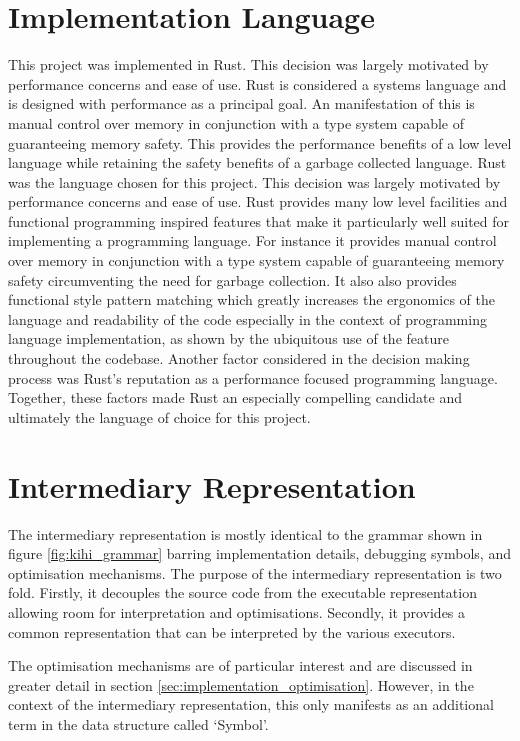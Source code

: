 \section{Implementation Language}
This project was implemented in Rust. This decision was largely motivated by performance concerns and ease of use. Rust is considered a systems language and is designed with performance as a principal goal. An manifestation of this is manual control over memory in conjunction with a type system capable of guaranteeing memory safety. This provides the performance benefits of a low level language while retaining the safety benefits of a garbage collected language. 
Rust was the language chosen for this project. This decision was largely motivated by performance concerns and ease of use. Rust provides many low level facilities and functional programming inspired features that make it particularly well suited for implementing a programming language. For instance it provides manual control over memory in conjunction with a type system capable of guaranteeing memory safety circumventing the need for garbage collection. It also also provides functional style pattern matching which greatly increases the ergonomics of the language and readability of the code especially in the context of programming language implementation, as shown by the ubiquitous use of the feature throughout the codebase. Another factor considered in the decision making process was Rust's reputation as a performance focused programming language. Together, these factors made Rust an especially compelling candidate and ultimately the language of choice for this project.


\section{Intermediary Representation}\label{sec:implementation_intermediary_representation}
The intermediary representation is mostly identical to the grammar shown in figure \ref{fig:kihi_grammar} barring implementation details, debugging symbols, and optimisation mechanisms. The purpose of the intermediary representation is two fold. Firstly, it decouples the source code from the executable representation allowing room for interpretation and optimisations. Secondly, it provides a common representation that can be interpreted by the various executors.

The optimisation mechanisms are of particular interest and are discussed in greater detail in section \ref{sec:implementation_optimisation}. However, in the context of the intermediary representation, this only manifests as an additional term in the data structure called `Symbol'.

